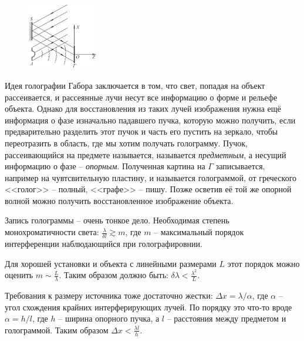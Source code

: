 \begin{figure}
  \begin{center}
    \includegraphics[width=0.28\textwidth]{figures/s54_1.png}
  \end{center}
\end{figure}
Идея голографии Габора заключается в том, что свет, попадая на объект рассеивается, и рассеянные лучи несут все информацию о форме и рельефе объекта. Однако для восстановления из таких лучей изображения нужна ещё информация о фазе изначально падавшего пучка, которую можно получить, если предварительно разделить этот пучок и часть его пустить на зеркало, чтобы переотразить в область, где мы хотим получать голограмму.
Пучок, рассеивающийся на предмете называется, называется \textit{предметным}, а несущий информацию о фазе -- \textit{опорным}.
Полученная картина на $\Gamma$ записывается, например на чувтсвительную пластину,  и называется голограммой, от греческого <<голог>> -- полный, <<графе>> -- пишу. Позже осветив её той же опорной волной можно получить восстановленное изображение объекта.

Запись голограммы -- очень тонкое дело. Необходимая степень монохроматичности света:
	$\boxed{\frac{\lambda}{\delta l} \gtrsim m}$,
	где $m$ -- максимальный порядок интерференции наблюдающийся при голографировнии.

Для хорошей установки и объекта с линейными размерами $L $ этот порядок можно оценить $\boxed{m \sim \frac{L}{\lambda}}$.
Таким образом должно быть: $\boxed{\delta\lambda < \frac{\lambda^2}{L}}$.

Требования к размеру источника тоже достаточно жестки: $\Delta x = \lambda/\alpha$, где $\alpha$ -- угол схождения крайних интерферирующих лучей. По порядку это что-то вроде $\alpha = h/l$, где $h$ -- ширина опорного пучка, а $l$ -- расстояния между предметом и голограммой. Таким образом $\boxed{\Delta x < \frac{\lambda l}{h}}$.

